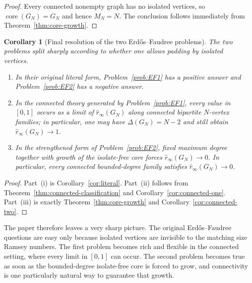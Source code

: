 \documentclass[11pt]{article}
\newcommand{\sri}{\hat r_{\infty}}
\newcommand{\core}{\operatorname{core}}
\newtheorem{corollary}[theorem]{Corollary}
\theoremstyle{definition}
\theoremstyle{remark}
\begin{document}
\begin{proof}
Every connected nonempty graph has no isolated vertices, so $\core(G_N)=G_N$ and hence
$M_N=N$. The conclusion follows immediately from Theorem~\ref{thm:core-growth}.
\end{proof}

\begin{corollary}[Final resolution of the two Erd\H{o}s--Faudree problems]
\label{cor:final}
The two problems split sharply according to whether one allows padding by isolated vertices.
\begin{enumerate}[label={\rm (\roman*)}]
\item In their original literal form, Problem~\ref{prob:EF1} has a positive answer and
Problem~\ref{prob:EF2} has a negative answer.
\item In the connected theory generated by Problem~\ref{prob:EF1}, every value in $[0,1]$
occurs as a limit of $\sri(G_N)$ along connected bipartite $N$-vertex families; in particular,
one may have $\Delta(G_N)=N-2$ and still obtain $\sri(G_N)\to 1$.
\item In the strengthened form of Problem~\ref{prob:EF2}, fixed maximum degree together
with growth of the isolate-free core forces $\sri(G_N)\to 0$. In particular, every connected
bounded-degree family satisfies $\sri(G_N)\to 0$.
\end{enumerate}
\end{corollary}

\begin{proof}
Part~\textup{(i)} is Corollary~\ref{cor:literal}. Part~\textup{(ii)} follows from
Theorem~\ref{thm:connected-classification} and Corollary~\ref{cor:connected-one}.
Part~\textup{(iii)} is exactly Theorem~\ref{thm:core-growth} and
Corollary~\ref{cor:connected-two}.
\end{proof}

The paper therefore leaves a very sharp picture. The original Erd\H{o}s--Faudree questions
are easy only because isolated vertices are invisible to the matching size Ramsey numbers. The
first problem becomes rich and flexible in the connected setting, where every limit in $[0,1]$
can occur. The second problem becomes true as soon as the bounded-degree isolate-free core
is forced to grow, and connectivity is one particularly natural way to guarantee that growth.
\end{document}
